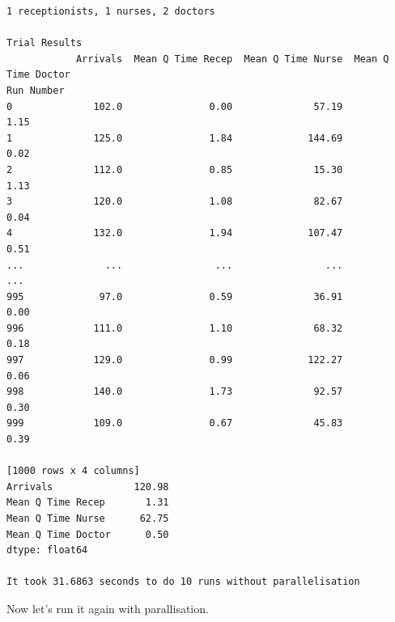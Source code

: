 \documentclass[
  letterpaper,
  DIV=11,
  numbers=noendperiod]{scrreprt}
\begin{document}
\begin{verbatim}
1 receptionists, 1 nurses, 2 doctors

Trial Results
            Arrivals  Mean Q Time Recep  Mean Q Time Nurse  Mean Q Time Doctor
Run Number                                                                    
0              102.0               0.00              57.19                1.15
1              125.0               1.84             144.69                0.02
2              112.0               0.85              15.30                1.13
3              120.0               1.08              82.67                0.04
4              132.0               1.94             107.47                0.51
...              ...                ...                ...                 ...
995             97.0               0.59              36.91                0.00
996            111.0               1.10              68.32                0.18
997            129.0               0.99             122.27                0.06
998            140.0               1.73              92.57                0.30
999            109.0               0.67              45.83                0.39

[1000 rows x 4 columns]
Arrivals              120.98
Mean Q Time Recep       1.31
Mean Q Time Nurse      62.75
Mean Q Time Doctor      0.50
dtype: float64

It took 31.6863 seconds to do 10 runs without parallelisation
\end{verbatim}

Now let's run it again with parallisation.

\begin{tcolorbox}[enhanced jigsaw, colframe=quarto-callout-note-color-frame, bottomtitle=1mm, breakable, rightrule=.15mm, coltitle=black, colbacktitle=quarto-callout-note-color!10!white, opacityback=0, leftrule=.75mm, arc=.35mm, toptitle=1mm, title=\textcolor{quarto-callout-note-color}{\faInfo}\hspace{0.5em}{Click here to view the full code}, titlerule=0mm, colback=white, toprule=.15mm, bottomrule=.15mm, left=2mm, opacitybacktitle=0.6]

\end{tcolorbox}
\end{document}
